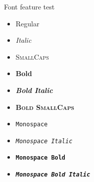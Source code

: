 \documentclass[10pt]{beamer}
\begin{document}
\begin{frame}{Font feature test}
  \begin{itemize}
    \item Regular
    \item \textit{Italic}
    \item \textsc{SmallCaps}
    \item \textbf{Bold}
    \item \textbf{\textit{Bold Italic}}
    \item \textbf{\textsc{Bold SmallCaps}}
    \item \texttt{Monospace}
    \item \texttt{\textit{Monospace Italic}}
    \item \texttt{\textbf{Monospace Bold}}
    \item \texttt{\textbf{\textit{Monospace Bold Italic}}}
  \end{itemize}
\end{frame}
\end{document}
